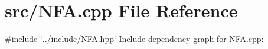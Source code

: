 \section{src/\+N\+FA.cpp File Reference}
\label{_n_f_a_8cpp}
{\ttfamily \#include \char`\"{}../include/\+N\+F\+A.\+hpp\char`\"{}}\newline
Include dependency graph for N\+F\+A.\+cpp\+:
